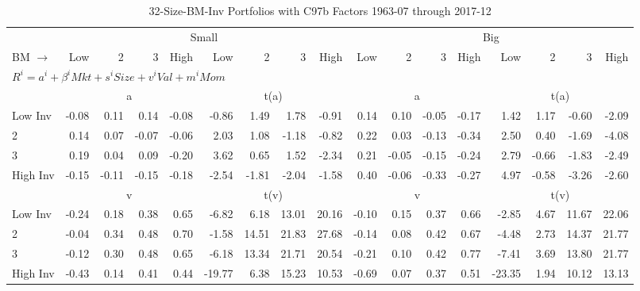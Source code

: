 
\begin{table}[!ht]
\footnotesize
\centering
\caption{32-Size-BM-Inv Portfolios with C97b Factors 1963-07 through 2017-12}
\begin{tabular}{lrrrrrrrrrrrrrrrr}
  \toprule
    & \multicolumn{8}{c}{Small} & \multicolumn{8}{c}{Big} \\
      \cmidrule(r){2-9} \cmidrule(r){10-17}
    BM $\rightarrow$ & Low & 2 & 3 & High & Low & 2 & 3 & High & Low & 2 & 3 & High & Low & 2 & 3 & High \\ 
  \midrule
  \multicolumn{17}{l}{$R^i=a^i+\beta^iMkt+s^iSize+v^iVal+m^iMom$} \\

  
    
      & \multicolumn{4}{c}{a} & \multicolumn{4}{c}{t(a)}
    
      & \multicolumn{4}{c}{a} & \multicolumn{4}{c}{t(a)}
    
    \\
      \cmidrule(r){2-5} \cmidrule(r){6-9} \cmidrule(r){10-13} \cmidrule(r){14-17}

    Low Inv   & -0.08  & 0.11  & 0.14  & -0.08  & -0.86  & 1.49  & 1.78  & -0.91  & 0.14  & 0.10  & -0.05  & -0.17  & 1.42  & 1.17  & -0.60  & -2.09  \\
           2  & 0.14  & 0.07  & -0.07  & -0.06  & 2.03  & 1.08  & -1.18  & -0.82  & 0.22  & 0.03  & -0.13  & -0.34  & 2.50  & 0.40  & -1.69  & -4.08  \\
           3  & 0.19  & 0.04  & 0.09  & -0.20  & 3.62  & 0.65  & 1.52  & -2.34  & 0.21  & -0.05  & -0.15  & -0.24  & 2.79  & -0.66  & -1.83  & -2.49  \\
    High Inv  & -0.15  & -0.11  & -0.15  & -0.18  & -2.54  & -1.81  & -2.04  & -1.58  & 0.40  & -0.06  & -0.33  & -0.27  & 4.97  & -0.58  & -3.26  & -2.60  \\

  
    
      & \multicolumn{4}{c}{v} & \multicolumn{4}{c}{t(v)}
    
      & \multicolumn{4}{c}{v} & \multicolumn{4}{c}{t(v)}
    
    \\
      \cmidrule(r){2-5} \cmidrule(r){6-9} \cmidrule(r){10-13} \cmidrule(r){14-17}

    Low Inv   & -0.24  & 0.18  & 0.38  & 0.65  & -6.82  & 6.18  & 13.01  & 20.16  & -0.10  & 0.15  & 0.37  & 0.66  & -2.85  & 4.67  & 11.67  & 22.06  \\
           2  & -0.04  & 0.34  & 0.48  & 0.70  & -1.58  & 14.51  & 21.83  & 27.68  & -0.14  & 0.08  & 0.42  & 0.67  & -4.48  & 2.73  & 14.37  & 21.77  \\
           3  & -0.12  & 0.30  & 0.48  & 0.65  & -6.18  & 13.34  & 21.71  & 20.54  & -0.21  & 0.10  & 0.42  & 0.77  & -7.41  & 3.69  & 13.80  & 21.77  \\
    High Inv  & -0.43  & 0.14  & 0.41  & 0.44  & -19.77  & 6.38  & 15.23  & 10.53  & -0.69  & 0.07  & 0.37  & 0.51  & -23.35  & 1.94  & 10.12  & 13.13  \\


\end{tabular}
\end{table}
